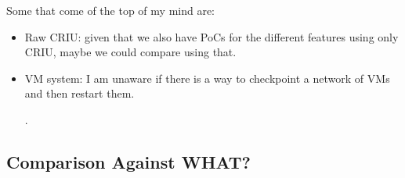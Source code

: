 Some that come of the top of my mind are:
\begin{itemize}
    \item Raw CRIU: given that we also have PoCs for the different features using only CRIU, maybe we could compare using that.
    \item VM system: I am unaware if there is a way to checkpoint a network of VMs and then restart them.
    
    .
\end{itemize}

\subsection{Comparison Against WHAT?}
